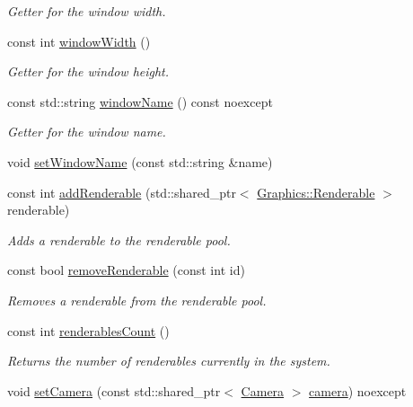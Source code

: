 \begin{DoxyCompactItemize}
\begin{DoxyCompactList}\small\item\em Getter for the window width. \end{DoxyCompactList}\item 
const int \hyperlink{class_graphics_1_1_graphics_system_adab3606d554a85ca13aaaec29ceee68c}{window\+Width} ()
\begin{DoxyCompactList}\small\item\em Getter for the window height. \end{DoxyCompactList}\item 
const std\+::string \hyperlink{class_graphics_1_1_graphics_system_a691efb4de942f8da79ecbcf626280724}{window\+Name} () const noexcept
\begin{DoxyCompactList}\small\item\em Getter for the window name. \end{DoxyCompactList}\item 
void \hyperlink{class_graphics_1_1_graphics_system_ab29908cef9460cc06f49f1b29714748d}{set\+Window\+Name} (const std\+::string \&name)
\item 
const int \hyperlink{class_graphics_1_1_graphics_system_ac35c2d3d32e1264b8daad6d59c3aba57}{add\+Renderable} (std\+::shared\+\_\+ptr$<$ \hyperlink{class_graphics_1_1_renderable}{Graphics\+::\+Renderable} $>$ renderable)
\begin{DoxyCompactList}\small\item\em Adds a renderable to the renderable pool. \end{DoxyCompactList}\item 
const bool \hyperlink{class_graphics_1_1_graphics_system_a476b0e6945c37c7b2d48bddcf246a389}{remove\+Renderable} (const int id)
\begin{DoxyCompactList}\small\item\em Removes a renderable from the renderable pool. \end{DoxyCompactList}\item 
const int \hyperlink{class_graphics_1_1_graphics_system_a2b37c3e6f53707002c72c38062be6617}{renderables\+Count} ()
\begin{DoxyCompactList}\small\item\em Returns the number of renderables currently in the system. \end{DoxyCompactList}\item 
void \hyperlink{class_graphics_1_1_graphics_system_af940e335bfde6fdf344466505f685e6b}{set\+Camera} (const std\+::shared\+\_\+ptr$<$ \hyperlink{class_graphics_1_1_camera}{Camera} $>$ \hyperlink{class_graphics_1_1_graphics_system_a6d00900277f81eba008fe030ee6bcb2e}{camera}) noexcept

\end{DoxyCompactItemize}
